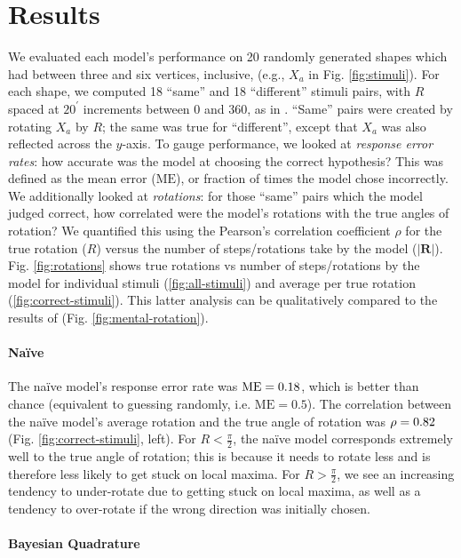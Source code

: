 \documentclass{article} %
\newcommand{\ME}[0]{\mathrm{ME}}
\newcommand{\naive}[0]{na\"ive}
\newcommand{\Naive}[0]{Na\"ive}
\begin{document}
\section{Results}

We evaluated each model's performance on 20 randomly generated shapes
which had between three and six vertices, inclusive, (e.g., $X_a$ in
Fig.  \ref{fig:stimuli}). For each shape, we computed 18 ``same'' and
18 ``different'' stimuli pairs, with $R$ spaced at $20^\prime$
increments between 0 and 360, as in \cite{Shepard1971}. ``Same'' pairs
were created by rotating $X_a$ by $R$; the same was true for
``different'', except that $X_a$ was also reflected across the
$y$-axis. To gauge performance, we looked at \textit{response error
  rates}: how accurate was the model at choosing the correct
hypothesis? This was defined as the mean error ($\ME{}$), or fraction
of times the model chose incorrectly.  We additionally looked at
\textit{rotations}: for those ``same'' pairs which the model judged
correct, how correlated were the model's rotations with the true
angles of rotation?  We quantified this using the Pearson's
correlation coefficient $\rho$ for the true rotation ($R$) versus the
number of steps/rotations take by the model ($\vert
\mathbf{R}\vert$). Fig. \ref{fig:rotations} shows true rotations vs
number of steps/rotations by the model for individual stimuli
(\ref{fig:all-stimuli}) and average per true rotation
(\ref{fig:correct-stimuli}). This latter analysis can be qualitatively
compared to the results of \cite{Shepard1971} (Fig.
\ref{fig:mental-rotation}).

\paragraph{\Naive{}} 

The \naive{} model's response error rate was $\NaiveME{}$, which is
better than chance (equivalent to guessing randomly,
i.e. $\ME{}=0.5$). The correlation between the \naive{} model's
average rotation and the true angle of rotation was $\rho=0.82{}$
(Fig. \ref{fig:correct-stimuli}, left). For $R<\frac{\pi}{2}$, the
\naive{} model corresponds extremely well to the true angle of
rotation; this is because it needs to rotate less and is therefore
less likely to get stuck on local maxima. For $R>\frac{\pi}{2}$, we
see an increasing tendency to under-rotate due to getting stuck on
local maxima, as well as a tendency to over-rotate if the wrong
direction was initially chosen.

\paragraph{Bayesian Quadrature}
\end{document}

